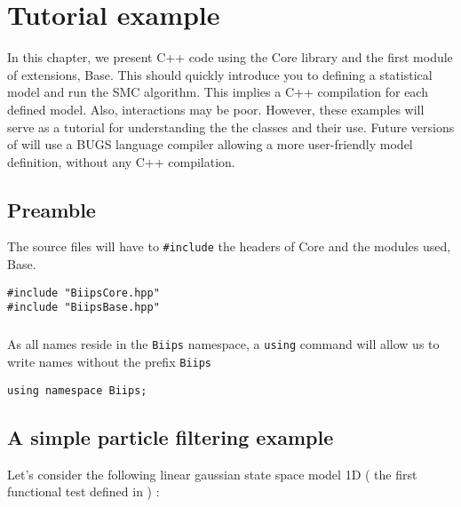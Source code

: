 \chapter{Tutorial example}
\label{examples}


In this chapter, we present C++ code using the \biips Core library and the first module of extensions, \biips Base. This should quickly introduce you to defining a statistical model and run the SMC algorithm. This implies a C++ compilation for each defined model. Also, interactions may be poor. However, these examples will serve as a tutorial for understanding the the classes and their use. Future versions of \biips{} will use a BUGS language compiler allowing a more user-friendly model definition, without any C++ compilation.

\section{Preamble}

The source files will have to \verb=#include= the headers of \biips Core and the modules used, \eg{} \biips Base.
\begin{lstlisting}
#include "BiipsCore.hpp"
#include "BiipsBase.hpp"
\end{lstlisting}

\paragraph{}
As all \biips{} names reside in the \verb=Biips= namespace, a \verb=using= command will allow us to write \biips{} names without the prefix \verb=Biips=
\begin{lstlisting}
using namespace Biips;
\end{lstlisting}


\section{A simple particle filtering example}

Let's consider the following linear gaussian state space model 1D (\ie{} the first functional test defined in \cite{biips_specifications_2010}) :

